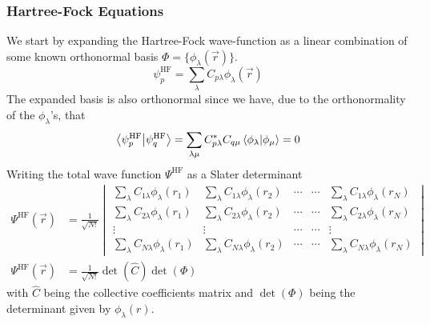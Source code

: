 \documentclass[a4paper, hidelinks, 10pt]{article}
\begin{document}
\subsubsection{Hartree-Fock Equations}
\label{ssub:Hartree-Fock Equations}
    We start by expanding the Hartree-Fock wave-function as a linear
    combination of some known orthonormal basis $\Phi=\{\phi_{\lambda}(\vec{r})\}$.
        \begin{equation}
            \psi^{\text{HF}}_p =
            \sum_{\lambda}C_{p\lambda}\phi_{\lambda}(\vec{r})
            \label{eq:HFpsi}
        \end{equation}
    The expanded basis is also orthonormal since we have, due to the
    orthonormality of the $\phi_{\lambda}$'s, that
    \begin{equation}
        \bra{\psi^{\text{HF}}_p}\ket{\psi^{\text{HF}}_q} =
        \sum_{\lambda\mu}C^{*}_{p\lambda}C_{q\mu}\bra{\phi_{\lambda}}\ket{\phi_{\mu}}
        = 0
        \label{eq:HFpsiOrtho}
    \end{equation}
    Writing the total wave function $\Psi^{\text{HF}}$ as a Slater
    determinant
        \begin{align}
            \Psi^{\text{HF}}(\vec{r}) &= \frac{1}{\sqrt{N!}}
                \begin{vmatrix}
                    \sum_{\lambda}C_{1\lambda}\phi_{\lambda}(r_1) &
                    \sum_{\lambda}C_{1\lambda}\phi_{\lambda}(r_2) & \dotsb & \dotsb &
                    \sum_{\lambda}C_{1\lambda}\phi_{\lambda}(r_N) \\
                    \sum_{\lambda}C_{2\lambda}\phi_{\lambda}(r_1) &
                    \sum_{\lambda}C_{2\lambda}\phi_{\lambda}(r_2) & \dotsb & \dotsb &
                    \sum_{\lambda}C_{2\lambda}\phi_{\lambda}(r_N) \\
                    \vdots & \vdots & \dotsb & \dotsb & \vdots \\
                    \sum_{\lambda}C_{N\lambda}\phi_{\lambda}(r_1) &
                    \sum_{\lambda}C_{N\lambda}\phi_{\lambda}(r_2) & \dotsb & \dotsb &
                    \sum_{\lambda}C_{N\lambda}\phi_{\lambda}(r_N)
                \end{vmatrix} \nonumber \\
            \Psi^{\text{HF}}(\vec{r}) &= \frac{1}{\sqrt{N!}}\det(\hat{C})\det(\Phi)
            \label{eq:psiSlater}
        \end{align}
    with $\hat{C}$ being the collective coefficients matrix and $\det(\Phi)$
    being the determinant given by $\phi_{\lambda}(r)$. \\
\end{document}
